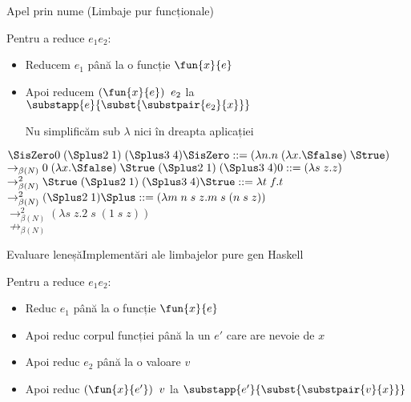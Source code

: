 \documentclass[xcolor=pdftex,romanian,colorlinks]{beamer}
\begin{document}
\begin{frame}{Apel prin nume (Limbaje pur funcționale)} 
\begin{block}{}
Pentru a reduce $e_1 \mathrel{} e_2$:
\begin{itemize}
\item  Reducem $e_1$ până la o funcție $\fun{x}{e}$
\item Apoi reducem $(\fun{x}{e}) \mathrel{}e_2$ la $\substapp{e}{\subst{\substpair{e_2}{x}}}$
\item[Nu] simplificăm sub $\lambda$ nici în dreapta aplicației
\end{itemize}
\end{block}

\pause

$\SisZero 0\; (\Splus 2\; 1)\; (\Splus 3\; 4) \hfill \SisZero ::= (\lambda n. n\;(\lambda x. \Sfalse)\; \Strue)$\\
$\rightarrow_{\beta(N)} 0\;(\lambda x. \Sfalse)\; \Strue\; (\Splus 2\; 1)\; (\Splus 3\; 4) \hfill 0 ::= (\lambda s\; z.z)$\\
$\rightarrow_{\beta(N)}^2 \Strue\; (\Splus 2\; 1)\; (\Splus 3\; 4)
 \hfill \Strue ::= \lambda t\; f.t$\\
$\rightarrow_{\beta(N)}^2 (\Splus 2\; 1) \hfill \Splus ::= (\lambda m\; n\; s\; z.m\; s\; (n\; s\; z))$\\
$\rightarrow_{\beta(N)}^2 (\lambda s\; z.2\; s\; (1\; s\; z))$\\
$\not\rightarrow_{\beta(N)}$

\end{frame}

\begin{frame}{Evaluare leneșă}{Implementări ale limbajelor pure gen Haskell}
\begin{block}{}
Pentru a reduce $e_1 \mathrel{} e_2$:
\begin{itemize}
\item  Reduc $e_1$ până la o funcție
$\fun{x}{e}$
\item Apoi reduc corpul funcției  până la un $e'$ care are nevoie de $x$
\item Apoi reduc $e_2$ până la o valoare $v$
\item Apoi reduc $(\fun{x}{e'})\mathrel{} v$ la $\substapp{e'}{\subst{\substpair{v}{x}}}$
\end{itemize}
\end{block}

\end{frame}
\end{document}
